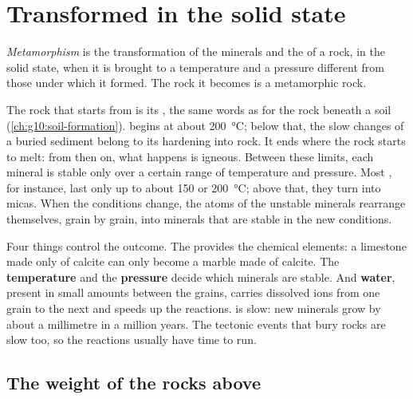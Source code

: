 \section{Transformed in the solid state}

\begin{definition}[Metamorphism]\label{def:g12:metamorphic-rocks:metamorphism}
\emph{Metamorphism} is the transformation of the
minerals and the  of a rock, in the solid state, when it is brought
to a temperature and a pressure different from those under which it formed.
The rock it becomes is a metamorphic rock.
\end{definition}

The rock that  starts from is its , the same words as
for the rock beneath a soil (\cref{ch:g10:soil-formation}).  begins at about \qty{200}{\celsius}; below that, the slow
changes of a buried sediment belong to its hardening into rock. It ends
where the rock starts to melt: from then on, what happens is igneous. Between
these limits, each mineral is stable only over a certain range of
temperature and pressure. Most , for instance, last only up to
about 150 or \qty{200}{\celsius}; above that, they turn into micas. When the
conditions change, the atoms of the unstable minerals rearrange themselves,
grain by grain, into minerals that are stable in the new conditions.

Four things control the outcome. The \textbf{} provides the
chemical elements: a limestone made only of calcite can only become a
marble made of calcite. The \textbf{temperature} and the \textbf{pressure} decide which
minerals are stable. And \textbf{water}, present in small amounts between
the grains, carries dissolved ions from one grain to the next and speeds up
the reactions.  is slow: new minerals grow by about a millimetre
in a million years. The tectonic events that bury rocks are slow too, so the
reactions usually have time to run.

\subsection{The weight of the rocks above}


